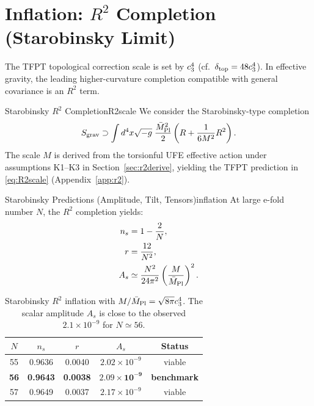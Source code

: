 \section{\texorpdfstring{Inflation: $R^2$ Completion (Starobinsky Limit)}{Inflation: R2 Completion (Starobinsky Limit)}}

The TFPT topological correction scale is set by $c_3^4$ (cf.\ $\delta_{\mathrm{top}} = 48c_3^4$). 
In effective gravity, the leading higher-curvature completion compatible with general covariance is an $R^2$ term.

\begin{definition}{Starobinsky $R^2$ Completion}{R2scale}
We consider the Starobinsky-type completion
\begin{equation}
    S_{\text{grav}} \supset \int d^4x\sqrt{-g}\;\frac{\bar{M}_{\mathrm{Pl}}^2}{2}\left(R + \frac{1}{6M^2}R^2\right).
    \label{eq:R2action}
\end{equation}
The scale $M$ is derived from the torsionful UFE effective action under
assumptions K1--K3 in Section~\ref{sec:r2derive}, yielding the TFPT prediction in
\eqref{eq:R2scale} (Appendix~\ref{app:r2}).
\end{definition}

\begin{theorem}{Starobinsky Predictions (Amplitude, Tilt, Tensors)}{inflation}
At large e-fold number $N$, the $R^2$ completion yields:
\begin{align}
    n_s &= 1 - \frac{2}{N}, \label{eq:ns}\\
    r &= \frac{12}{N^2}, \label{eq:r}\\
    A_s &\simeq \frac{N^2}{24\pi^2}\left(\frac{M}{\bar{M}_{\mathrm{Pl}}}\right)^2. \label{eq:As}
\end{align}
\end{theorem}

\begin{table}[H]
\centering
\begin{tabular}{@{}ccccc@{}}
\toprule
$N$ & $n_s$ & $r$ & $A_s$ & \textbf{Status}\\
\midrule
55 & 0.9636 & 0.0040 & $2.02\times10^{-9}$ & viable\\
\textbf{56} & \textbf{0.9643} & \textbf{0.0038} & $\mathbf{2.09\times10^{-9}}$ & \textbf{benchmark}\\
57 & 0.9649 & 0.0037 & $2.17\times10^{-9}$ & viable\\
\bottomrule
\end{tabular}
\caption{Starobinsky $R^2$ inflation with $M/\bar{M}_{\mathrm{Pl}}=\sqrt{8\pi}c_3^4$. The scalar amplitude $A_s$ is close to the observed $2.1\times10^{-9}$ for $N\simeq 56$.}
\label{tab:inflation}
\end{table}

